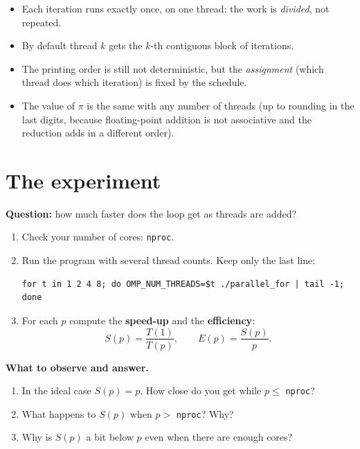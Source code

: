\documentclass[11pt,a4paper]{article}
\begin{document}
\begin{keyidea}
\begin{itemize}
  \item Each iteration runs exactly once, on one thread: the work is \emph{divided},
        not repeated.
  \item By default thread $k$ gets the $k$-th contiguous block of iterations.
  \item The printing order is still not deterministic, but the \emph{assignment}
        (which thread does which iteration) is fixed by the schedule.
  \item The value of $\pi$ is the same with any number of threads (up to rounding in the
        last digits, because floating-point addition is not associative and the
        reduction adds in a different order).
\end{itemize}
\end{keyidea}

\section{The experiment}
\begin{experiment}
\textbf{Question:} how much faster does the loop get as threads are added?
\begin{enumerate}
  \item Check your number of cores: \texttt{nproc}.
  \item Run the program with several thread counts. Keep only the last line:
\begin{lstlisting}[style=sh]
for t in 1 2 4 8; do OMP_NUM_THREADS=$t ./parallel_for | tail -1; done
\end{lstlisting}
  \item For each $p$ compute the \textbf{speed-up} and the \textbf{efficiency}:
        \[
          S(p) = \frac{T(1)}{T(p)}, \qquad E(p) = \frac{S(p)}{p}.
        \]
\end{enumerate}
\textbf{What to observe and answer.}
\begin{enumerate}
  \item In the ideal case $S(p)=p$. How close do you get while $p \le$ \texttt{nproc}?
  \item What happens to $S(p)$ when $p >$ \texttt{nproc}? Why?
  \item Why is $S(p)$ a bit below $p$ even when there are enough cores?
\end{enumerate}
\end{experiment}
\end{document}
